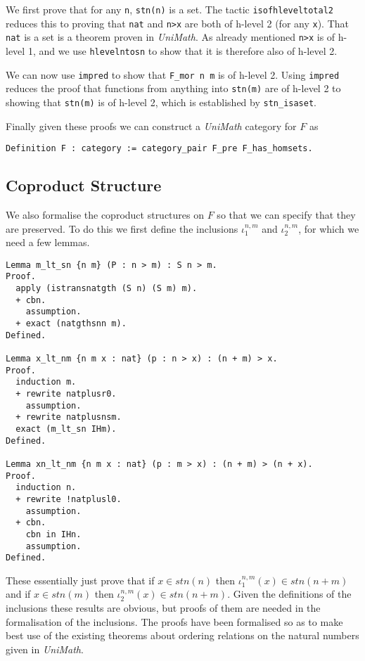 We first prove that for any \lstinline|n|, \lstinline|stn(n)| is a set. The tactic
\lstinline|isofhleveltotal2| reduces this to proving that \lstinline|nat| and \lstinline|n>x|
are both of h-level 2 (for any \lstinline|x|). That \lstinline|nat| is a set is a theorem
proven in \textit{UniMath}. As already mentioned \lstinline|n>x| is of h-level 1, and
we use \lstinline|hlevelntosn| to show that it is therefore also of h-level 2.

We can now use \lstinline|impred| to show that \lstinline|F_mor n m| is of h-level 2.
Using \lstinline|impred| reduces the proof that functions from anything into
\lstinline|stn(m)| are of h-level 2 to showing that \lstinline|stn(m)| is of h-level 2,
which is established by \lstinline|stn_isaset|.

Finally given these proofs we can construct a \textit{UniMath} category for $F$
as
\begin{lstlisting}
Definition F : category := category_pair F_pre F_has_homsets.
\end{lstlisting}

\subsection{Coproduct Structure}
We also formalise the coproduct structures on $F$ so that we can specify that
they are preserved. To do this we first define the inclusions $\iota_1^{n,m}$
and $\iota_2^{n,m}$, for which we need a few lemmas.

\begin{lstlisting}
Lemma m_lt_sn {n m} (P : n > m) : S n > m.
Proof.
  apply (istransnatgth (S n) (S m) m).
  + cbn.
    assumption.
  + exact (natgthsnn m).
Defined.

Lemma x_lt_nm {n m x : nat} (p : n > x) : (n + m) > x.
Proof.
  induction m.
  + rewrite natplusr0.
    assumption.
  + rewrite natplusnsm.
  exact (m_lt_sn IHm).
Defined.

Lemma xn_lt_nm {n m x : nat} (p : m > x) : (n + m) > (n + x).
Proof.
  induction n.
  + rewrite !natplusl0.
    assumption.
  + cbn.
    cbn in IHn.
    assumption.
Defined.
\end{lstlisting}

These essentially just prove that if $x\in stn(n)$ then $\iota_1^{n,m}(x) \in
stn(n+m)$ and if $x\in stn(m)$ then $\iota_2^{n,m}(x)\in stn(n+m)$. Given the
definitions of the inclusions these results are obvious, but proofs of them are
needed in the formalisation of the inclusions. The proofs have been formalised
so as to make best use of the existing theorems about ordering relations on the
natural numbers given in \textit{UniMath}.

